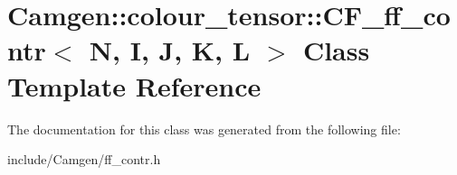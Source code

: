 \hypertarget{a00033}{}\section{Camgen\+:\+:colour\+\_\+tensor\+:\+:C\+F\+\_\+ff\+\_\+contr$<$ N, I, J, K, L $>$ Class Template Reference}
\label{a00033}


The documentation for this class was generated from the following file\+:\begin{DoxyCompactItemize}
\item 
include/\+Camgen/ff\+\_\+contr.\+h\end{DoxyCompactItemize}
